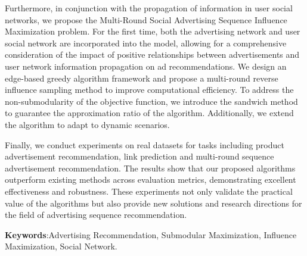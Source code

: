 Furthermore, in conjunction with the propagation of information in user social networks, we propose the Multi-Round Social Advertising Sequence Influence Maximization problem. For the first time, both the advertising network and user social network are incorporated into the model, allowing for a comprehensive consideration of the impact of positive relationships between advertisements and user network information propagation on ad recommendations. We design an edge-based greedy algorithm framework and propose a multi-round reverse influence sampling method to improve computational efficiency. To address the non-submodularity of the objective function, we introduce the sandwich method to guarantee the approximation ratio of the algorithm. Additionally, we extend the algorithm to adapt to dynamic scenarios.

Finally, we conduct experiments on real datasets for tasks including product advertisement recommendation, link  prediction and multi-round sequence advertisement recommendation. The results show that our proposed algorithms outperform existing methods across evaluation metrics, demonstrating excellent effectiveness and robustness. These experiments not only validate the practical value of the algorithms but also provide new solutions and research directions for the field of advertising sequence recommendation.

\textbf{Keywords}:Advertising Recommendation, Submodular Maximization, Influence Maximization, Social Network.